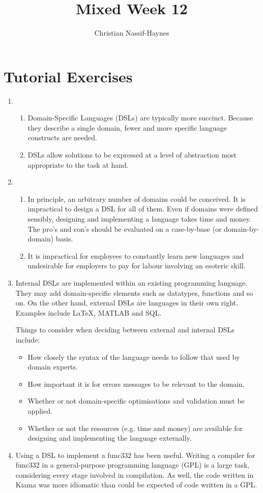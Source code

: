 \documentclass[a4paper]{article}
\begin{document}
	\title{Mixed Week 12}
	\author{Christian Nassif-Haynes}
	\maketitle
	
	\section*{Tutorial Exercises}
	\begin{enumerate}
		\item
		\begin{enumerate}
			\item Domain-Specific Languages (DSLs) are typically more succinct. Because they describe a single domain, fewer and more specific language constructs are needed.
			\item DSLs allow solutions to be expressed at a level of abstraction most appropriate to the task at hand.
		\end{enumerate}
		\item
		\begin{enumerate}
			\item In principle, an arbitrary number of domains could be conceived. It is impractical to design a DSL for all of them. Even if domains were defined sensibly, designing and implementing a language takes time and money. The pro's and con's should be evaluated on a case-by-base (or domain-by-domain) basis.
			\item It is impractical for employees to constantly learn new languages and undesirable for employers to pay for labour involving an esoteric skill.
		\end{enumerate}
		\item Internal DSLs are implemented within an existing programming language. They may add domain-specific elements such as datatypes, functions and so on. On the other hand, external DSLs are languages in their own right. Examples include \LaTeX , MATLAB and SQL.
		
		Things to consider when deciding between external and internal DSLs include:
		\begin{itemize}
			\item How closely the syntax of the language needs to follow that used by domain experts.
			\item How important it is for errors messages to be relevant to the domain.
			\item Whether or not domain-specific optimisations and validation must be applied.
			\item Whether or not the resources (e.g. time and money) are available for designing and implementing the language externally.
		\end{itemize}
		\item Using a DSL to implement a func332 has been useful. Writing a compiler for func332 in a general-purpose programming language (GPL) is a large task, considering every stage involved in compilation. As well, the code written in Kiama was more idiomatic than could be expected of code written in a GPL.
		

\end{enumerate}
\end{document}
